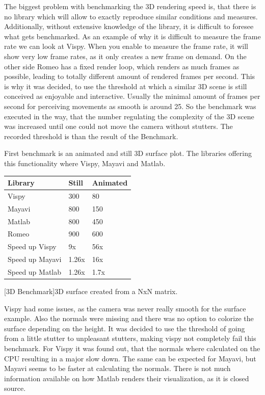 The biggest problem with benchmarking the 3D rendering speed is, that there is no library which will allow to exactly reproduce similar conditions and measures. 
Additionally, without extensive knowledge of the library, it is difficult to foresee what gets benchmarked. 
As an example of why it is difficult to measure the frame rate we can look at Vispy. When you enable to measure the frame rate, it will show very low frame rates, as it only creates a new frame on demand.
On the other side Romeo has a fixed render loop, which renders as much frames as possible, leading to totally different amount of rendered frames per second. 
This is why it was decided, to use the threshold at which a similar 3D scene is still conceived as enjoyable and interactive. Usually the minimal amount of frames per second for perceiving movements as smooth is around 25.
So the benchmark was executed in the way, that the number regulating the complexity of the 3D scene was increased until one could not move the camera without stutters. The recorded threshold is than the result of the Benchmark.

First benchmark is an animated and still 3D surface plot. The libraries offering this functionality where Vispy, Mayavi and Matlab.

\begin{table}[htbp]
    \centering
    \begin{tabular}{l|l|l}
        \hline
        \textbf{Library} & \textbf{Still} & \textbf{Animated} \\
        \hline
        Vispy            & 300            & 80    \\
        Mayavi           & 800            & 150   \\
        Matlab           & 800            & 450   \\
        Romeo            & 900            & 600   \\
        \hline
        \hline
        Speed up Vispy   & 9x            & 56x   \\
        Speed up Mayavi  & 1.26x         & 16x   \\
        Speed up Matlab  & 1.26x         & 1.7x  \\
    \end{tabular}
    [3D Benchmark]{3D surface created from a NxN matrix.}
    \label{table:relativespeedoglw}
\end{table}
Vispy had some issues, as the camera was never really smooth for the surface example. Also the normals were missing and there was no option to colorize the surface depending on the height.
It was decided to use the threshold of going from a little stutter to unpleasant stutters, making vispy not completely fail this benchmark.
For Vispy it was found out, that the normals where calculated on the CPU resulting in a major slow down\cite{VispyGithub}. The same can be expected for Mayavi, but Mayavi seems to be faster at calculating the normals.
There is not much information available on how Matlab renders their visualization, as it is closed source.

